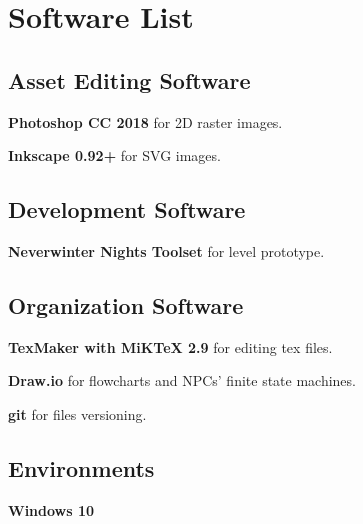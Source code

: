 \section{Software List}

\subsection{Asset Editing Software}
\textbf{Photoshop CC 2018} for 2D raster images.

\textbf{Inkscape 0.92+} for SVG images.

\subsection{Development Software}
\textbf{Neverwinter Nights Toolset} for level prototype.

\subsection{Organization Software}
\textbf{TexMaker with MiKTeX 2.9} for editing tex files.

\textbf{Draw.io} for flowcharts and NPCs' finite state machines.

\textbf{git} for files versioning.

\subsection{Environments}
\textbf{Windows 10}
